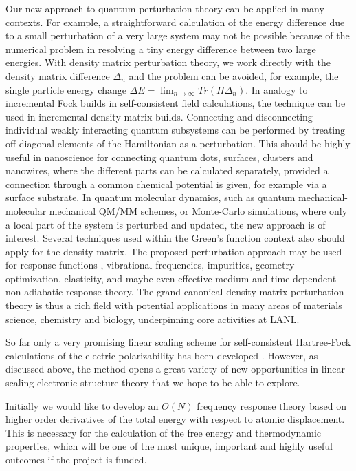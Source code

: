 Our new approach to quantum perturbation theory can be applied in many contexts.
For example, a straightforward calculation of the energy difference
due to a small perturbation of a very large system may not be possible because
of the numerical problem in resolving a tiny energy difference between
two large energies. With density matrix perturbation theory,
we work directly with the density matrix difference $\Delta_n$ and the
problem can be avoided, for example, the single particle energy change
$\Delta E = \lim_{n \rightarrow \infty} Tr(H\Delta_n)$. In analogy to incremental 
Fock builds in self-consistent field calculations, the technique
can be used in incremental density matrix builds.
Connecting and disconnecting individual weakly interacting
quantum subsystems can be performed by treating off-diagonal elements of the
Hamiltonian as a perturbation. This should be highly useful in nanoscience
for connecting quantum dots, surfaces, clusters and nanowires, where the different
parts can be calculated separately, provided a connection through a common
chemical potential is given, for example via a surface substrate.
In quantum molecular dynamics, such as quantum mechanical-molecular mechanical QM/MM
schemes, or Monte-Carlo simulations, where only a local part of the system is perturbed
and updated, the new approach is of interest.
Several techniques used within the Green's function context also should
apply for the density matrix. The proposed perturbation approach may
be used for response functions \cite{Weber04}, vibrational frequencies,
impurities, geometry optimization, elasticity, and maybe even effective medium and 
time dependent non-adiabatic response theory.
The grand canonical density matrix perturbation theory is thus a rich field
with potential applications in many areas of materials science, chemistry 
and biology, underpinning core activities at LANL.

So far only a very promising linear scaling scheme for self-consistent
Hartree-Fock calculations of the electric polarizability has been developed \cite{Weber04}.
However, as discussed above, the method opens a great variety of new opportunities in linear 
scaling electronic structure theory that we hope to be able to explore. 

Initially we would like to develop an $O(N)$ frequency response theory based 
on higher order derivatives of the total energy with respect to atomic displacement.
This is necessary for the calculation of the free energy and thermodynamic
properties, which will be one of the most unique, important and highly
useful outcomes if the project is funded. 

